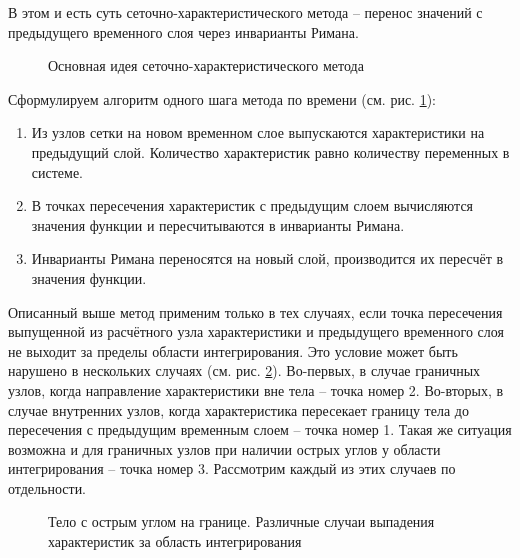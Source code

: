 В этом и есть суть сеточно-характеристического метода -- перенос значений с предыдущего временного слоя через инварианты Римана.
\begin{figure}[H]
	\caption{Основная идея сеточно-характеристического метода}
	\label{pic:gcm-idea}
\end{figure}
Сформулируем алгоритм одного шага метода по времени (см. рис. \ref{pic:gcm-idea}):
\begin{enumerate}
	\item Из узлов сетки на новом временном слое выпускаются характеристики на предыдущий слой. Количество характеристик равно количеству переменных в системе.
	\item В точках пересечения характеристик с предыдущим слоем вычисляются значения функции и пересчитываются в инварианты Римана.
	\item Инварианты Римана переносятся на новый слой, производится их пересчёт в значения функции.
\end{enumerate}

Описанный выше метод применим только в тех случаях, если точка пересечения выпущенной из расчётного узла характеристики и предыдущего временного слоя не выходит за пределы области интегрирования. Это условие может быть нарушено в нескольких случаях (см. рис. \ref{pic:outer-cases}). Во-первых, в случае граничных узлов, когда направление характеристики вне тела -- точка номер 2. Во-вторых, в случае внутренних узлов, когда характеристика пересекает границу тела до пересечения с предыдущим временным слоем -- точка номер 1. Такая же ситуация возможна и для граничных узлов при наличии острых углов у области интегрирования -- точка номер 3. Рассмотрим каждый из этих случаев по отдельности.
\begin{figure}[H]
	\caption{Тело с острым углом на границе. Различные случаи выпадения характеристик за область интегрирования}
	\label{pic:outer-cases}
\end{figure}


